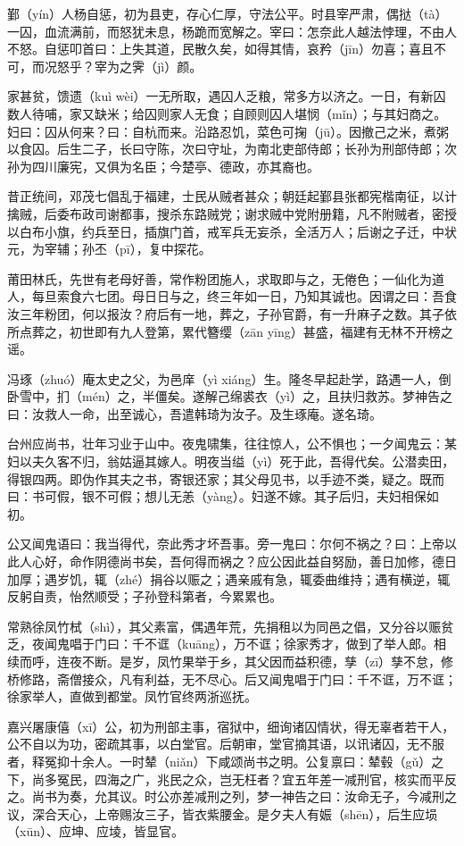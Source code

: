 \documentclass[12pt,UTF8]{ctexbook}
\begin{document}
鄞（yín）人杨自惩，初为县吏，存心仁厚，守法公平。时县宰严肃，偶挞（tà）一囚，血流满前，而怒犹未息，杨跪而宽解之。宰曰：怎奈此人越法悖理，不由人不怒。自惩叩首曰：上失其道，民散久矣，如得其情，哀矜（jīn）勿喜；喜且不可，而况怒乎？宰为之霁（jì）颜。

家甚贫，馈遗（kuì  wèi）一无所取，遇囚人乏粮，常多方以济之。一日，有新囚数人待哺，家又缺米；给囚则家人无食；自顾则囚人堪悯（mǐn）；与其妇商之。妇曰：囚从何来？曰：自杭而来。沿路忍饥，菜色可掬（jū）。因撤己之米，煮粥以食囚。后生二子，长曰守陈，次曰守址，为南北吏部侍郎；长孙为刑部侍郎；次孙为四川廉宪，又俱为名臣；今楚亭、德政，亦其裔也。

昔正统间，邓茂七倡乱于福建，士民从贼者甚众；朝廷起鄞县张都宪楷南征，以计擒贼，后委布政司谢都事，搜杀东路贼党；谢求贼中党附册籍，凡不附贼者，密授以白布小旗，约兵至日，插旗门首，戒军兵无妄杀，全活万人；后谢之子迁，中状元，为宰辅；孙丕（pī），复中探花。

莆田林氏，先世有老母好善，常作粉团施人，求取即与之，无倦色；一仙化为道人，每旦索食六七团。母日日与之，终三年如一日，乃知其诚也。因谓之曰：吾食汝三年粉团，何以报汝？府后有一地，葬之，子孙官爵，有一升麻子之数。其子依所点葬之，初世即有九人登第，累代簪缨（zān  yīng）甚盛，福建有无林不开榜之谣。

冯琢（zhuó）庵太史之父，为邑庠（yì  xiáng）生。隆冬早起赴学，路遇一人，倒卧雪中，扪（mén）之，半僵矣。遂解己绵裘衣（yì）之，且扶归救苏。梦神告之曰：汝救人一命，出至诚心，吾遣韩琦为汝子。及生琢庵。遂名琦。

台州应尚书，壮年习业于山中。夜鬼啸集，往往惊人，公不惧也；一夕闻鬼云：某妇以夫久客不归，翁姑逼其嫁人。明夜当缢（yì）死于此，吾得代矣。公潜卖田，得银四两。即伪作其夫之书，寄银还家；其父母见书，以手迹不类，疑之。既而曰：书可假，银不可假；想儿无恙（yàng）。妇遂不嫁。其子后归，夫妇相保如初。

公又闻鬼语曰：我当得代，奈此秀才坏吾事。旁一鬼曰：尔何不祸之？曰：上帝以此人心好，命作阴德尚书矣，吾何得而祸之？应公因此益自努励，善日加修，德日加厚；遇岁饥，辄（zhé）捐谷以赈之；遇亲戚有急，辄委曲维持；遇有横逆，辄反躬自责，怡然顺受；子孙登科第者，今累累也。

常熟徐凤竹栻（shì），其父素富，偶遇年荒，先捐租以为同邑之倡，又分谷以赈贫乏，夜闻鬼唱于门曰：千不诓（kuāng），万不诓；徐家秀才，做到了举人郎。相续而呼，连夜不断。是岁，凤竹果举于乡，其父因而益积德，孳（zī）孳不怠，修桥修路，斋僧接众，凡有利益，无不尽心。后又闻鬼唱于门曰：千不诓，万不诓；徐家举人，直做到都堂。凤竹官终两浙巡抚。

嘉兴屠康僖（xī）公，初为刑部主事，宿狱中，细询诸囚情状，得无辜者若干人，公不自以为功，密疏其事，以白堂官。后朝审，堂官摘其语，以讯诸囚，无不服者，释冤抑十余人。一时辇（niǎn）下咸颂尚书之明。公复禀曰：辇毂（gǔ）之下，尚多冤民，四海之广，兆民之众，岂无枉者？宜五年差一减刑官，核实而平反之。尚书为奏，允其议。时公亦差减刑之列，梦一神告之曰：汝命无子，今减刑之议，深合天心，上帝赐汝三子，皆衣紫腰金。是夕夫人有娠（shēn），后生应埙（xūn）、应坤、应堎，皆显官。
\end{document}
